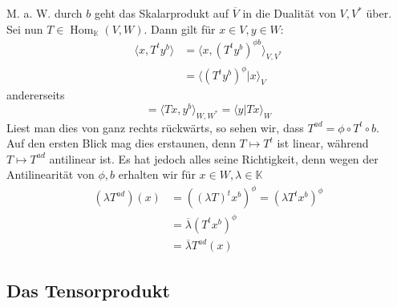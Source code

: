 \documentclass[12pt,a4paper]{article}
\theoremstyle{definition}
\theoremstyle{remark}
\renewcommand{\bar}[1]{\overline{#1}}
\DeclareMathOperator{\Hom}{Hom}
\begin{document}
	M. a. W. durch $b$ geht das Skalarprodukt auf $\bar{V}$ in die Dualität von $V, V^*$ über. \\
	Sei nun $T \in \Hom_{\mathbb{K}}(V,W)$. Dann gilt für $x \in V, y \in W$: 
	\begin{equation}
		\begin{split}
			\langle x, T^t y^b \rangle &= \langle x, (T^t y^b)^{\phi b} \rangle_{V,V^*} \\
			&= \langle (T^t y^b)^{\phi} | x \rangle_V
		\end{split}
	\end{equation}
	andererseits
	\begin{equation}
		= \langle Tx, y^b \rangle_{W, W^*} = \langle y | Tx \rangle_W
	\end{equation}
	Liest man dies von ganz rechts rückwärts, so sehen wir, dass $T^{ad} = \phi \circ T^t \circ b$. \\
	Auf den ersten Blick mag dies erstaunen, denn $T \mapsto T^t$ ist linear, während $T \mapsto T^{ad}$ antilinear ist. Es hat jedoch alles seine Richtigkeit, denn wegen der Antilinearität von $\phi, b$ erhalten wir für $x \in W, \lambda \in \mathbb{K}$
	\begin{equation}
		\begin{split}
			(\lambda T^{ad})(x) &= \left( (\lambda T )^t x^b \right)^{\phi} = (\lambda T^t x^b)^{\phi} \\
			&= \bar{\lambda}(T^t x^b)^{\phi} \\
			&= \bar{\lambda} T^{ad}(x)
		\end{split}
	\end{equation}
	
	\newpage	
	
	\subsection{Das Tensorprodukt}
	
\end{document}
